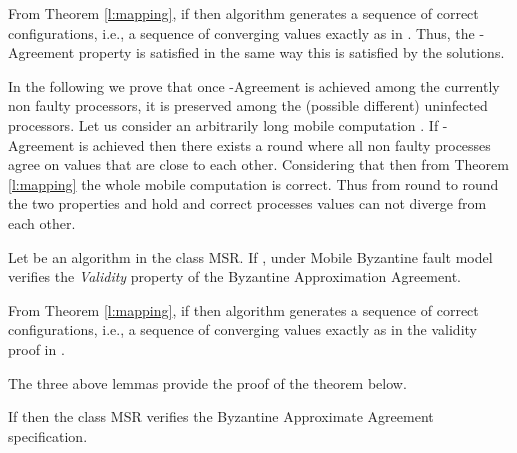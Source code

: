 \begin{proofL}
From Theorem \ref{l:mapping}, if  then algorithm  generates a sequence of correct configurations, i.e., a sequence of converging values exactly as in \cite{DLPS86,KA94}. Thus, the -Agreement property is satisfied in the same way this is satisfied by the \cite{DLPS86,KA94} solutions. 

In the following we prove that once -Agreement is achieved among the currently non faulty processors, it is preserved among the (possible different) uninfected processors.
	Let us consider an arbitrarily long mobile computation . If -Agreement is achieved then there exists a round  where all non faulty processes agree on values that are  close to each other. Considering that  then from Theorem \ref{l:mapping} the whole mobile computation  is correct. Thus from round to round the two properties  and  hold and correct processes values can not diverge from each other.

\renewcommand{\toto}{l:agreement}
\end{proofL}

\begin{lemma}[Validity]\label{l:validity}
Let  be an algorithm in the class MSR.   If ,  under Mobile Byzantine fault model verifies the \emph{Validity} property of the Byzantine Approximation Agreement.
\end{lemma}

\begin{proofL}
	From Theorem \ref{l:mapping}, if  then algorithm  generates a sequence of correct configurations, i.e., a sequence of converging values exactly as in the validity proof in \cite{DLPS86,KA94}. 
\renewcommand{\toto}{l:validity}
\end{proofL}









The three above lemmas provide the proof of the theorem below.
\begin{theorem}\label{t:mapping}
If  then the class  MSR verifies the Byzantine Approximate Agreement specification.
\end{theorem}
%
